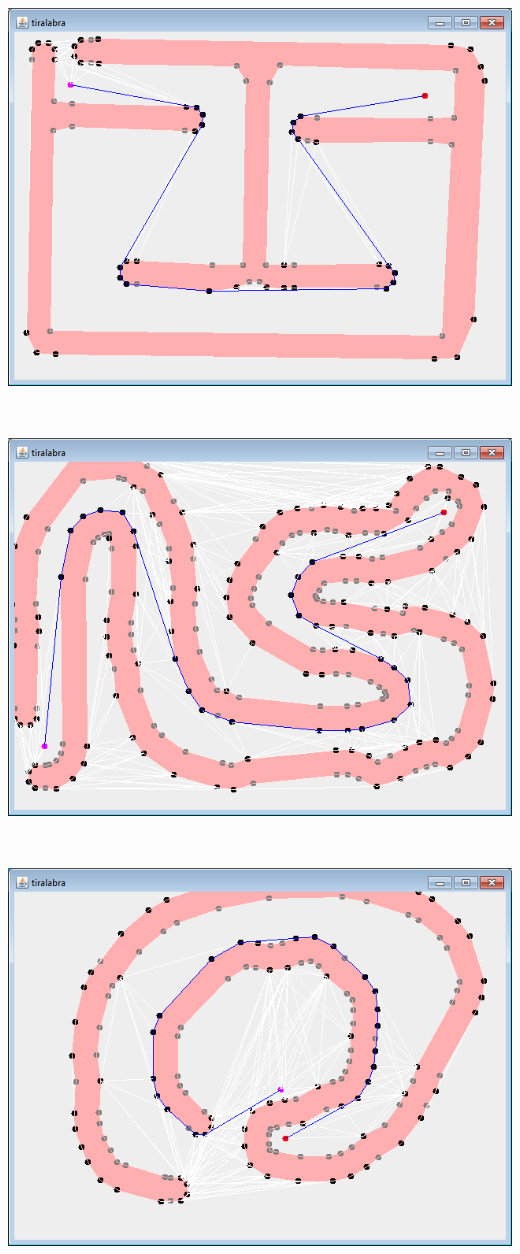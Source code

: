 \documentclass[a4paper,12pt]{article}
\begin{document}
\centerline{\includegraphics[scale=0.75]{example03.png}} \hspace*{\fill} \\
\centerline{\includegraphics[scale=0.75]{example04.png}} \hspace*{\fill} \\
\centerline{\includegraphics[scale=0.75]{example05.png}} \hspace*{\fill} \\
\end{document}
